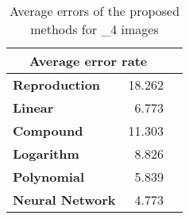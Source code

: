 \begin{table}[H]
  \begin{center}
  \resizebox{5cm}{!} {
    \begin{tabular}{l r r}
    \multicolumn{2}{c}{\textbf{Average error rate}} \\ \hline 
        \textbf{Reproduction} & 18.262\\ 
        \textbf{Linear} & 6.773\\ 
        \textbf{Compound} & 11.303\\ 
        \textbf{Logarithm} & 8.826\\ 
        \textbf{Polynomial} & 5.839\\ 
        \textbf{Neural Network} & 4.773\\ 
    \end{tabular}
  }
  \caption{Average errors of the proposed methods for _4 images }
  \end{center}
\end{table}
